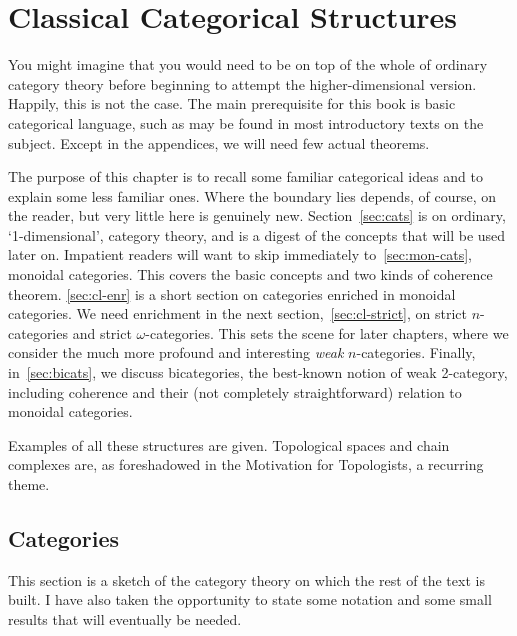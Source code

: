 
\chapter{Classical Categorical Structures}



\noindent
You might imagine that you would need to be on top of the whole of ordinary
category theory before beginning to attempt the higher-dimensional version.
Happily, this is not the case.  The main prerequisite for this book is
basic categorical language, such as may be found in most introductory texts
on the subject.  Except in the appendices, we will need few actual
theorems.

The purpose of this chapter is to recall some familiar categorical ideas
and to explain some less familiar ones.  Where the boundary lies depends,
of course, on the reader, but very little here is genuinely new.
Section~\ref{sec:cats} is on ordinary, `1-dimensional', category theory,
and is a digest of the concepts that will be used later on.  Impatient
readers will want to skip immediately to~\ref{sec:mon-cats}, monoidal
categories.  This covers the basic concepts and two kinds of coherence
theorem.  \ref{sec:cl-enr} is a short section on categories enriched in
monoidal categories.  We need enrichment in the next
section,~\ref{sec:cl-strict}, on strict $n$-categories and strict
$\omega$-categories.  This sets the scene for later chapters, where we
consider the much more profound and interesting \emph{weak} $n$-categories.
Finally, in~\ref{sec:bicats}, we discuss bicategories, the best-known
notion of weak 2-category, including coherence and their (not completely
straightforward) relation to monoidal categories.

Examples of all these structures are given.  Topological spaces and chain
complexes are, as foreshadowed in the Motivation for Topologists, a
recurring theme.


\section{Categories}

This section is a sketch of the category theory on which the rest of the
text is built.  I have also taken the opportunity to state some notation
and some small results that will eventually be needed.

